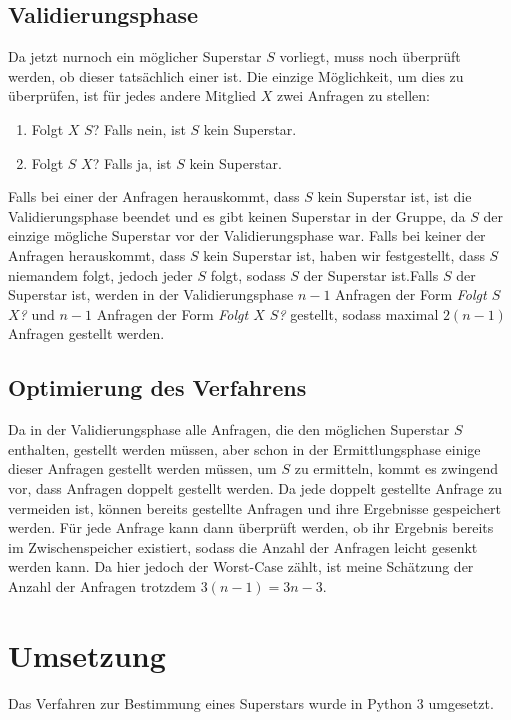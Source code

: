 \documentclass[a4paper,10pt,ngerman]{scrartcl}
\begin{document}
\subsection{Validierungsphase}
Da jetzt nurnoch ein möglicher Superstar $S$ vorliegt, muss noch überprüft werden, ob dieser tatsächlich einer ist. Die einzige Möglichkeit, um dies zu überprüfen, ist für jedes andere Mitglied $X$ zwei Anfragen zu stellen:
\begin{enumerate}
\item Folgt $X$ $S$? Falls nein, ist $S$ kein Superstar.
\item Folgt $S$ $X$? Falls ja, ist $S$ kein Superstar.
\end{enumerate}
Falls bei einer der Anfragen herauskommt, dass $S$ kein Superstar ist, ist die Validierungsphase beendet und es gibt keinen Superstar in der Gruppe, da $S$ der einzige mögliche Superstar vor der Validierungsphase war.\newline
Falls bei keiner der Anfragen herauskommt, dass $S$ kein Superstar ist, haben wir festgestellt, dass $S$ niemandem folgt, jedoch jeder $S$ folgt, sodass $S$ der Superstar ist.\newline Falls $S$ der Superstar ist, werden in der Validierungsphase $n-1$ Anfragen der Form \textit{Folgt $S$ $X$?} und $n-1$ Anfragen der Form \textit{Folgt $X$ $S$?} gestellt, sodass maximal $2(n-1)$ Anfragen gestellt werden.

\subsection{Optimierung des Verfahrens}
Da in der Validierungsphase alle Anfragen, die den möglichen Superstar $S$ enthalten, gestellt werden müssen, aber schon in der Ermittlungsphase einige dieser Anfragen gestellt werden müssen, um $S$ zu ermitteln, kommt es zwingend vor, dass Anfragen doppelt gestellt werden. Da jede doppelt gestellte Anfrage zu vermeiden ist, können bereits gestellte Anfragen und ihre Ergebnisse gespeichert werden. Für jede Anfrage kann dann überprüft werden, ob ihr Ergebnis bereits im Zwischenspeicher existiert, sodass die Anzahl der Anfragen leicht gesenkt werden kann. Da hier jedoch der Worst-Case zählt, ist meine Schätzung der Anzahl der Anfragen trotzdem $3(n-1) = 3n-3$.

\clearpage

\section{Umsetzung}
Das Verfahren zur Bestimmung eines Superstars wurde in Python 3 umgesetzt.
\end{document}
